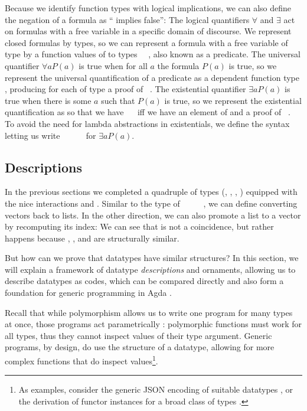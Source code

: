 Because we identify function types with logical implications, we can also define the negation of a formula  as `` implies false'':
The logical quantifiers $\forall$ and $\exists$ act on formulas with a free variable in a specific domain of discourse. We represent closed formulas by types, so we can represent a formula with a free variable of type  by a function values of  to types \ \ , also known as a predicate. The universal quantifier $\forall a P(a)$ is true when for all $a$ the formula $P(a)$ is true, so we represent the universal quantification of a predicate  as a dependent function type , producing for each  of type  a proof of \ . The existential quantifier $\exists a P(a)$ is true when there is some $a$ such that $P(a)$ is true, so we represent the existential quantification as
so that we have \ \  iff we have an element  of  and a proof  of \ . To avoid the need for lambda abstractions in existentials, we define the syntax
letting us write \AD{Σ[}\ \ \ \ \AD{]}\  for $\exists a P(a)$.

\subsection{Descriptions}\label{sec:background-descriptions}
In the previous sections we completed a quadruple of types (\bN{}, , , ) equipped with the nice interactions  and . Similar to the type of \ \AV{:}\ \ \ \ \bN{}, we can define
converting vectors back to lists. In the other direction, we can also promote a list to a vector by recomputing its index:
We can see that is not a coincidence, but rather happens because \bN{}, , and  are structurally similar.

But how can we prove that datatypes have similar structures? In this section, we will explain a framework of datatype \emph{descriptions} and ornaments, allowing us to describe datatypes as codes, which can be compared directly and also form a foundation for generic programming in Agda \cite{ulftutorial, genericsamm, effectfully, practgen}. 

Recall that while polymorphism allows us to write one program for many types at once, those programs act parametrically \cite{reynolds1983types, wadlerfree}: polymorphic functions must work for all types, thus they cannot inspect values of their type argument. Generic programs, by design, do use the structure of a datatype, allowing for more complex functions that do inspect values\footnote{As examples, consider the generic JSON encoding of suitable datatypes \cite{truesop}, or the derivation of functor instances for a broad class of types \cite{haskellderiving}.}.

